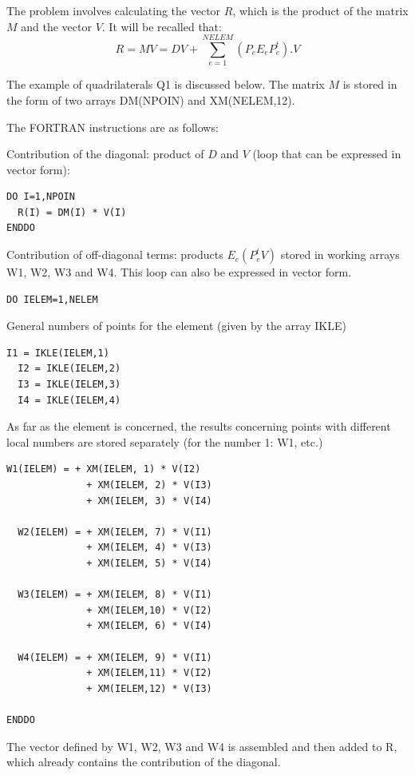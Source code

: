 The problem involves calculating the vector $R$, which is the product of the
matrix $M$ and the vector $V$. It will be recalled that:
\[R=MV=DV+\sum _{e=1}^{NELEM}(P_{e} E_{e} P_{e}^{t} ) .V\]

The example of quadrilaterals Q1 is discussed below. The matrix $M$ is stored in
the form of two arrays DM(NPOIN) and XM(NELEM,12).

The FORTRAN instructions are as follows:

Contribution of the diagonal: product of $D$ and $V$ (loop that can be expressed
in vector form):

\begin{lstlisting}[language=TelFortran]
DO I=1,NPOIN
  R(I) = DM(I) * V(I)
ENDDO
\end{lstlisting}

Contribution of off-diagonal terms: products $E_{e} (P_{e}^{t} V)$ stored in working arrays W1, W2, W3 and W4. This loop can also be expressed in vector form.

\begin{lstlisting}[language=TelFortran]
DO IELEM=1,NELEM
\end{lstlisting}

General numbers of points for the element (given by the array IKLE)

\begin{lstlisting}[language=TelFortran]
  I1 = IKLE(IELEM,1)
  I2 = IKLE(IELEM,2)
  I3 = IKLE(IELEM,3)
  I4 = IKLE(IELEM,4)
\end{lstlisting}

As far as the element is concerned, the results concerning points with different local numbers are stored separately (for the number 1: W1,  etc.)

\begin{lstlisting}[language=TelFortran]
  W1(IELEM) = + XM(IELEM, 1) * V(I2)
              + XM(IELEM, 2) * V(I3)
              + XM(IELEM, 3) * V(I4)

  W2(IELEM) = + XM(IELEM, 7) * V(I1)
              + XM(IELEM, 4) * V(I3)
              + XM(IELEM, 5) * V(I4)

  W3(IELEM) = + XM(IELEM, 8) * V(I1)
              + XM(IELEM,10) * V(I2)
              + XM(IELEM, 6) * V(I4)

  W4(IELEM) = + XM(IELEM, 9) * V(I1)
              + XM(IELEM,11) * V(I2)
              + XM(IELEM,12) * V(I3)

ENDDO
\end{lstlisting}

The vector defined by W1, W2, W3 and W4 is assembled and then added to R, which
already contains the contribution of the diagonal.

